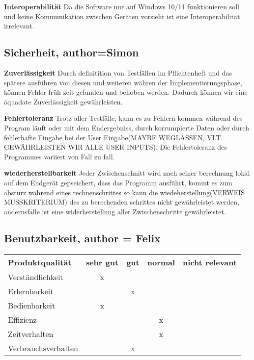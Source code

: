 \documentclass[parskip=full]{scrartcl} %
\begin{document}
\textbf{Interoperabilität}
\newline
Da die Software nur auf Windows 10/11 funktionieren soll und keine Kommunikation zwischen Geräten vorsieht ist eine Interoperabilität irrelevant.

\subsection{Sicherheit, author=Simon}

\textbf{Zuverlässigkeit}
Durch definitition von Testfällen im Pflichtenheft und das spätere ausführen von diesen und weiteren währen der Implementierungsphase, können Fehler früh zeit gefunden und behoben werden.
Dadurch können wir eine äquadate Zuverlässigkeit gewährleisten.

\textbf{Fehlertoleranz}
Trotz aller Testfälle, kann es zu Fehlern kommen während des Program läuft oder mit dem Endergebniss, durch korrumpierte Daten oder durch fehlerhafte Eingabe bei der User Eingabe(MAYBE WEGLASSEN, VLT. GEWÄHRLEISTEN WIR ALLE USER INPUTS).
Die Fehlertoleranz des Programmes variiert von Fall zu fall.

\textbf{wiederherstellbarkeit}
Jeder Zwischenschnitt wird nach seiner berechnung lokal auf dem Endgerät gepseichert, dass das Programm ausführt, kommt es zum absturz während eines rechnenschrittes so kann die wiedeherstellung(VERWEIS MUSSKRITERIUM) des zu berechenden schrittes nicht gewährleistet werden, andernsfalle ist  eine widerherstellung aller Zwischenschritte gewährleistet.


\subsection{Benutzbarkeit, author = Felix}

    \begin{tabular}{|l| c| c| c| c|}
    \hline
        Produktqualität & sehr gut & gut & normal & nicht relevant \\
    \hline
        Verständlichkeit & x & & &\\
    \hline
        Erlernbarkeit & & x & &\\
    \hline
        Bedienbarkeit & x & & &\\
    \hline
        Effizienz & & & x &\\
    \hline
        Zeitverhalten & & & x &\\
    \hline
        Verbrauchsverhalten & & x & &\\
    \hline
    \end{tabular}
\end{document}
